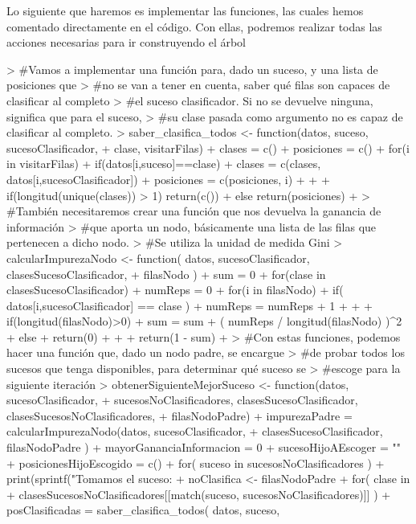 \documentclass[parskip=full]{scrartcl}
\begin{document}
Lo siguiente que haremos es implementar las funciones, las cuales hemos comentado directamente en el código. Con ellas, podremos realizar todas las acciones necesarias para ir construyendo el árbol


\begin{Schunk}
\begin{Sinput}
> #Vamos a implementar una función para, dado un suceso, y una lista de posiciones que 
> #no se van a tener en cuenta, saber qué filas son capaces de clasificar al completo 
> #el suceso clasificador. Si no se devuelve ninguna, significa que para el suceso, 
> #su clase pasada como argumento no es capaz de clasificar al completo.
> saber_clasifica_todos <- function(datos, suceso, sucesoClasificador, 
+ clase, visitarFilas) {
+   clases = c()
+   posiciones = c()
+   for(i in visitarFilas){
+     if(datos[i,suceso]==clase){
+       clases = c(clases, datos[i,sucesoClasificador])
+       posiciones = c(posiciones, i)
+     }
+   }
+   if(longitud(unique(clases)) > 1) { return(c()) }
+   else { return(posiciones) }
+ }
> #También necesitaremos crear una función que nos devuelva la ganancia de información 
> #que aporta un nodo, básicamente una lista de las filas que pertenecen a dicho nodo. 
> #Se utiliza la unidad de medida Gini
> calcularImpurezaNodo <- function( datos, sucesoClasificador, clasesSucesoClasificador,
+  filasNodo ) {
+   sum = 0
+   for(clase in clasesSucesoClasificador){
+     numReps = 0
+     for(i in filasNodo){
+       if( datos[i,sucesoClasificador] == clase ){
+         numReps = numReps + 1
+       }
+     }
+     if(longitud(filasNodo)>0){
+       sum = sum + ( numReps / longitud(filasNodo) )^2
+     } else {
+       return(0)
+     }
+   }
+   return(1 - sum)
+ }
> #Con estas funciones, podemos hacer una función que, dado un nodo padre, se encargue
> #de probar todos los sucesos que tenga disponibles, para determinar qué suceso se 
> #escoge para la siguiente iteración
> obtenerSiguienteMejorSuceso <- function(datos, sucesoClasificador, 
+ sucesosNoClasificadores, clasesSucesoClasificador, clasesSucesosNoClasificadores, 
+ filasNodoPadre) {
+   impurezaPadre = calcularImpurezaNodo(datos, sucesoClasificador, 
+   clasesSucesoClasificador, filasNodoPadre )
+   mayorGananciaInformacion = 0
+   sucesoHijoAEscoger = ""
+   posicionesHijoEscogido = c()
+   for( suceso in sucesosNoClasificadores ){
+     print(sprintf("Tomamos el suceso: %
+     noClasifica <- filasNodoPadre
+     for( clase in 
+ 	clasesSucesosNoClasificadores[[match(suceso, sucesosNoClasificadores)]] ){
+       posClasificadas = saber_clasifica_todos( datos, suceso, 
}}}
\end{Sinput}
\end{Schunk}
\end{document}
